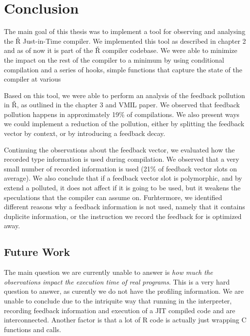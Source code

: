 \chapter*{Conclusion}

The main goal of this thesis was to implement a tool for observing and analysing the Ř Just-in-Time compiler. We implemented this tool as described in chapter 2 and as of now it is part of the Ř compiler codebase. We were able to minimize the impact on the rest of the compiler to a minimum by using conditional compilation and a series of hooks, simple functions that capture the state of the compiler at various

Based on this tool, we were able to perform an analysis of the feedback pollution in Ř, as outlined in the chapter 3 and VMIL paper\cite{feedback-vmil}. We observed that feedback pollution happens in approximately 19\% of compilations. We also present ways we could implement a reduction of the pollution, either by splitting the feedback vector by context, or by introducing a feedback decay.

Continuing the observations about the feedback vector, we evaluated how the recorded type information is used during compilation. We observed that a very small number of recorded information is used (21\% of feedback vector slots on average). We also conclude that if a feedback vector slot is polymorphic, and by extend a polluted, it does not affect if it is going to be used, but it weakens the speculations that the compiler can assume on. Furhtermore, we identified different reasons why a feedback information is not used, namely that it contains duplicite information, or the instruction we record the feedback for is optimized away.

\section*{Future Work}

The main question we are currently unable to answer is \textit{how much the observations impact the execution time of real programs}. This is a very hard question to answer, as curently we do not have the profiling information. We are unable to conclude
due to the intriquite way that running in the interpreter, recording feedback information and execution of a JIT compiled code and are interconnected. Another factor is that a lot of R code is actually just wrapping C functions and calls.


